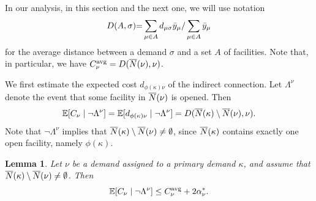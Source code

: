 \documentclass[oneside,final]{ucr}
\newtheorem{lemma}[theorem]{Lemma}
\begin{document}
In our analysis, in this section and the next one, we will use notation
%
\begin{equation*}
D(A,\sigma) {=} \sum_{\mu\in A}
d_{\mu\sigma}{\bar y}_{\mu}/\sum_{\mu\in A} {\bar y}_{\mu}
\end{equation*}
%
for the average distance between a demand $\sigma$ and a set $A$ of facilities.
Note that, in particular, we have $C^{{\mbox{\scriptsize\rm avg}}}_\nu = D({\overline{N}}(\nu),\nu)$.

We first estimate the expected cost $d_{\phi(\kappa)\nu}$ of the indirect
connection. Let $\Lambda^\nu$ denote the event that some 
facility in ${\overline{N}}(\nu)$ is opened. Then
%
\begin{equation}
	\mathbb{E}[C_\nu \mid\neg\Lambda^\nu] 
	=   \mathbb{E}[ d_{\phi(\kappa)\nu} \mid \neg\Lambda^\nu] 
	= 	D({\overline{N}}(\kappa) \setminus {\overline{N}}(\nu), \nu).
			\label{eqn: expected indirect connection}
\end{equation}
%
Note that $\neg\Lambda^\nu$ implies that ${\overline{N}}(\kappa) \setminus
{\overline{N}}(\nu)\neq\emptyset$, since ${\overline{N}}(\kappa)$ contains
exactly one open facility, namely $\phi(\kappa)$.


\begin{lemma}
  \label{lem:echu indirect}
  Let $\nu$ be a demand assigned to a primary demand $\kappa$, and
assume that ${\overline{N}}(\kappa) \setminus {\overline{N}}(\nu)\neq\emptyset$.
Then 
%
\begin{equation*}
	\mathbb{E}[ C_\nu \mid\neg\Lambda^\nu]  \leq
  		C^{{\mbox{\scriptsize\rm avg}}}_\nu+2\alpha_{\nu}^\ast.
\end{equation*}
\end{lemma}
\end{document}
